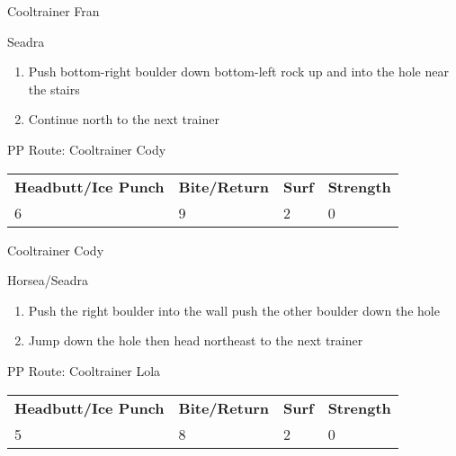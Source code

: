 \begin{paracol}{2}
\switchcolumn
\begin{trainer}{Cooltrainer Fran}
	\varwb
	\begin{fightSection}{Seadra}
		\item {} \return{} 
	\end{fightSection}
	\varwe
\end{trainer}

\begin{enumerate}[resume]
	\item Push bottom-right boulder down \pointRight{} bottom-left rock up and into the hole near the stairs
	\item Continue north to the next trainer
\end{enumerate}

\switchcolumn*
\begin{misc}{PP Route: Cooltrainer Cody}
	\varwb
	\begin{tabu} to \textwidth {X[6,c] X[5,c] X[4,c] X[4,c]}
		\textbf{Headbutt/Ice Punch} & \textbf{Bite/Return} & \textbf{Surf} & \textbf{Strength}\\ 
		6 & 9 & 2 & 0
	\end{tabu}
	\varwe
\end{misc}

\switchcolumn
\begin{trainer}{Cooltrainer Cody}
	\varwb
	\begin{fightSection}{Horsea/Seadra}
		\item {} \return{} 
	\end{fightSection}
	\varwe
\end{trainer}

\begin{enumerate}[resume]
	\item Push the right boulder into the wall \pointRight{} push the other boulder down the hole
	\item Jump down the hole then head northeast to the next trainer
\end{enumerate}

\switchcolumn*
\begin{misc}{PP Route: Cooltrainer Lola}
	\varwb
	\begin{tabu} to \textwidth {X[6,c] X[5,c] X[4,c] X[4,c]}
		\textbf{Headbutt/Ice Punch} & \textbf{Bite/Return} & \textbf{Surf} & \textbf{Strength}\\ 
		5 & 8 & 2 & 0
	\end{tabu}
	\varwe
\end{misc}


\end{paracol}
